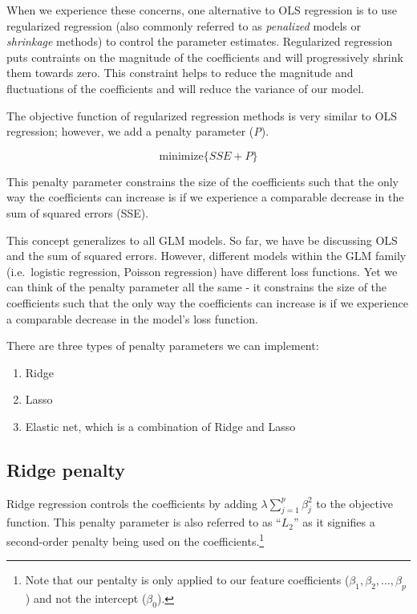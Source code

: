 \documentclass[]{book}
\providecommand{\tightlist}{%
  \setlength{\itemsep}{0pt}\setlength{\parskip}{0pt}}
\let\rmarkdownfootnote\footnote%
\def\footnote{\protect\rmarkdownfootnote}
\theoremstyle{definition}
\theoremstyle{definition}
\theoremstyle{definition}
\theoremstyle{remark}
\begin{document}
When we experience these concerns, one alternative to OLS regression is
to use regularized regression (also commonly referred to as
\emph{penalized} models or \emph{shrinkage} methods) to control the
parameter estimates. Regularized regression puts contraints on the
magnitude of the coefficients and will progressively shrink them towards
zero. This constraint helps to reduce the magnitude and fluctuations of
the coefficients and will reduce the variance of our model.

The objective function of regularized regression methods is very similar
to OLS regression; however, we add a penalty parameter (\emph{P}).

\begin{equation}
\label{eq:penalty}
\text{minimize} \big \{ SSE + P \big \}
\end{equation}

This penalty parameter constrains the size of the coefficients such that
the only way the coefficients can increase is if we experience a
comparable decrease in the sum of squared errors (SSE).

This concept generalizes to all GLM models. So far, we have be
discussing OLS and the sum of squared errors. However, different models
within the GLM family (i.e.~logistic regression, Poisson regression)
have different loss functions. Yet we can think of the penalty parameter
all the same - it constrains the size of the coefficients such that the
only way the coefficients can increase is if we experience a comparable
decrease in the model's loss function.

There are three types of penalty parameters we can implement:

\begin{enumerate}
\def\labelenumi{\arabic{enumi}.}
\tightlist
\item
  Ridge
\item
  Lasso
\item
  Elastic net, which is a combination of Ridge and Lasso
\end{enumerate}

\hypertarget{ridge}{%
\subsection{Ridge penalty}\label{ridge}}

Ridge regression \citep{hoerl1970ridge} controls the coefficients by
adding \(\lambda \sum^p_{j=1} \beta_j^2\) to the objective function.
This penalty parameter is also referred to as ``\(L_2\)'' as it
signifies a second-order penalty being used on the
coefficients.\footnote{Note that our pentalty is only applied to our
  feature coefficients (\(\beta_1, \beta_2, \dots, \beta_p\)) and not
  the intercept (\(\beta_0\)).}
\end{document}
